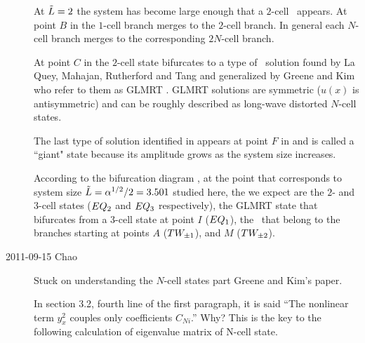 \begin{description}
At $\tilde{L}=2$ the system has become large enough that a $2$-cell \eqv\
appears. At point $B$ in  the $1$-cell branch
merges to the $2$-cell branch. In general each $N$-cell branch merges to
the corresponding $2N$-cell branch.

At point $C$ in  the $2$-cell state bifurcates to a
type of \eqv\ solution found by La Quey, Mahajan, Rutherford and
Tang\rf{laquey74} and generalized by Greene and Kim who refer to them as
GLMRT \eqva. GLMRT solutions are symmetric ($u(x)$ is antisymmetric) and
can be roughly described as long-wave distorted $N$-cell states.

The last type of solution identified in  appears at point $F$
in \reffig{fig:GreeneKim} and is called a
``giant" state because its amplitude grows as the system size increases.

According to the bifurcation diagram , at the point
that corresponds to system size $\tilde{L}=\alpha^{1/2}/2=3.501$ studied
here, the {\eqva} we expect are the $2$- and $3$-cell states ($EQ_{2}$
and $EQ_{3}$ respectively), the GLMRT state that bifurcates from a
$3$-cell state at point $I$ ($EQ_{1}$), the \reqva\ that belong to the
branches starting at points $A$ ($TW_{\pm1}$), and $M$
($TW_{\pm2}$).


\item[2011-09-15 Chao]
Stuck on understanding the $N$-cell states part Greene and Kim's paper.

In section 3.2, fourth line of the first paragraph, it is said ``The
nonlinear term $y_x^2$ couples only coefficients $C_{Ni}$.'' Why? This is
the key to the following calculation of eigenvalue matrix of N-cell
state.


\end{description}
